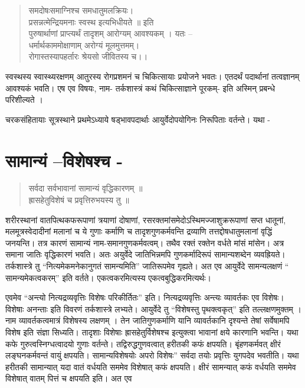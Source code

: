 \begin{verse}
समदोषःसमाग्निश्च समधातुमलक्रियः।\\
प्रसन्नत्मेन्द्रियमनाः स्वस्थ इत्यभिधीयते ॥ इति\\
पुरुषार्थाणां प्राप्त्यर्थं तादृशम् आरोग्यम् आवश्यकम् । यतः –\\
धर्मार्थकाममोक्षाणाम् अरोग्यं मूलमुत्तमम्।\\
रोगास्तस्यापहर्तारः श्रेयसो जीवितस्य च।।
\end{verse}
स्वस्थस्य स्वास्थ्यरक्षणम् आतुरस्य रोगप्रशमनं च चिकित्सायाः प्रयोजने भवतः। एतदर्थं पदार्थानां तत्वज्ञानम् आवश्यकं भवति। एष एव विषयः, नाम- तर्कशास्त्रं कथं चिकित्साज्ञाने पूरकम्- इति अस्मिन् प्रबन्धे परिशील्यते ।

चरकसंहितायाः सूत्रस्थाने प्रथमेऽध्याये षड्भावपदार्थाः आयुर्वेदोपयोगिनः निरूपिताः वर्तन्ते। यथा -

\section*{सामान्यं –विशेषश्च -}

\begin{verse}
सर्वदा सर्वभावानां सामान्यं वृद्धिकारणम् ॥\\
ह्रासहेतुविशेषं च प्रवृत्तिरुभयस्य तु ॥
\end{verse}

शरीरस्थानां वातपित्थकफरूपाणां त्रयाणां दोषाणां, रसरक्तमांसमेदोऽस्थिमज्जाशुक्ररूपाणां सप्त धातूनां, मलमूत्रस्वेदादीनां मलानां च ये गुणाः कर्माणि च तादृशगुणकर्मवन्ति द्रव्याणि तत्तद्दोषधातुमलानां वृद्धिं जनयन्ति। तत्र कारणं सामान्यं नाम-समानगुणकर्मवत्वम्। तथैव रक्तं रक्तेन वर्धते मांसं मांसेन। अत्र समाना जातिः वृद्धिकारणं भवति। अतः अयुर्वेदे जातिभिन्नमपि गुणकर्मादिरूपं सामान्यशब्देन व्यवह्रियते। तर्कशास्त्रे तु “नित्यमेकमनेकानुगतं सामन्यमिति” जातिरूपमेव गृह्यते। अत एव आयुर्वेदे सामन्यलक्षणं “ सामन्यमेकत्वकरम्” इति वर्तते। एकत्वकरमित्यस्य एकत्वबुद्धिकरमित्यर्थः।

एवमेव “अन्त्यो नित्यद्रव्यवृत्तिः विशेषः परिकीर्तितः” इति। नित्यद्रव्यवृत्तिः अन्त्यः व्यावर्तकः एव विशेषः। विशेषाः अनन्ताः इति विवरणं तर्कशास्त्रे लभ्यते। आयुर्वेदे तु “विशेषस्तु पृथक्त्वकृत्” इति तल्लक्षणमुक्तम् । नाम व्यावर्तकत्वमात्रं विशेषस्य लक्षणम् । तेन जातिगुणकर्माणि यानि व्यावर्तकानि दृश्यन्ते तेषां सर्वेषामपि विशेष इति संज्ञा सिध्यति। तादृशाः विशेषाः ह्रासहेतुर्विशेषश्च इत्युक्त्वा भावानां क्षये कारणानि भवन्ति। यथा कफे गुरुत्वस्निग्धत्वादयो गुणाः वर्तन्ते। तद्विरुद्धगुणवत्वात् हरीतकी कफं क्षपयति। बृंहणकर्मवत् क्षीरं लङ्घनकर्मवन्तं वायुं क्षपयति। सामान्यविशेषयोः अपरो विशेषः” सर्वदा तयोः प्रवृत्तिः युगपदेव भवतीति। यथा हरीतकी सामान्यात् यदा वातं वर्धयति सममेव विशेषात् कफं क्षपयति। क्षीरं सामन्यात् कफं वर्धयति सममेव विशेषात् वातम् पित्तं च क्षपयति इति। अत एव

